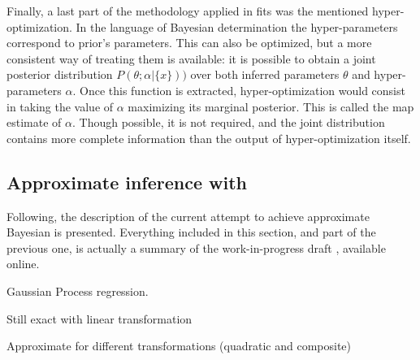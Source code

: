 Finally, a last part of the methodology applied in \nnpdf fits was the
mentioned hyper-optimization.
In the language of Bayesian determination the hyper-parameters correspond to
prior's parameters.
This can also be optimized, but a more consistent way of treating them is
available: it is possible to obtain a joint posterior distribution
$P\left(\theta;\alpha|\{x\}\right))$ over both inferred parameters $\theta$ and
hyper-parameters $\alpha$.
%
Once this function is extracted, hyper-optimization would consist in taking the
value of $\alpha$ maximizing its marginal posterior. This is called the
\acrfull{map} estimate of $\alpha$.
Though possible, it is not required, and the joint distribution contains more
complete information than the output of hyper-optimization itself.

\subsection{Approximate inference with \lsqfitgp}
\label{sec:gp/lsqfitgp}

Following, the description of the current attempt to achieve approximate
Bayesian \pdfs is presented.
Everything included in this section, and part of the previous one, is actually
a summary of the work-in-progress draft \cite{petrillo2022}, available online.


Gaussian Process regression.

Still exact with linear transformation

Approximate for different transformations (quadratic and composite)
